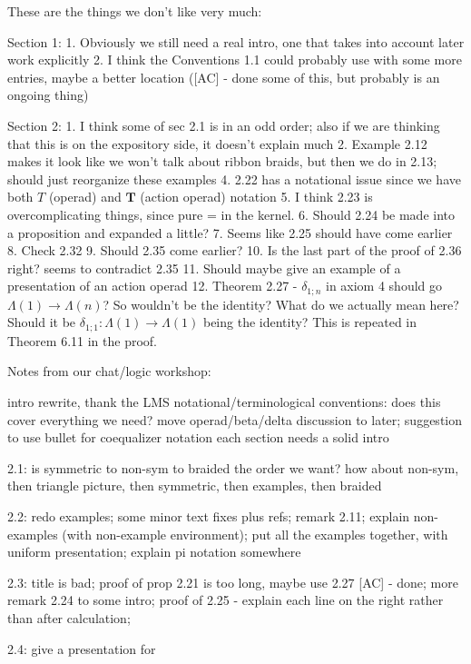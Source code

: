 These are the things we don't like very much:

Section 1:
1. Obviously we still need a real intro, one that takes into account later work explicitly
2. I think the Conventions 1.1 could probably use with some more entries, maybe a better location ([AC] - done some of this, but probably is an ongoing thing)

Section 2:
1. I think some of sec 2.1 is in an odd order; also if we are thinking that this is on the expository side, it doesn't explain much
2. Example 2.12 makes it look like we won't talk about ribbon braids, but then we do in 2.13; should just reorganize these examples
4. 2.22 has a notational issue since we have both $T$ (operad) and $\mathbf{T}$ (action operad) notation
5. I think 2.23 is overcomplicating things, since pure = in the kernel.
6. Should 2.24 be made into a proposition and expanded a little?
7. Seems like 2.25 should have come earlier
8. Check 2.32
9. Should 2.35 come earlier?
10. Is the last part of the proof of 2.36 right? seems to contradict 2.35
11. Should maybe give an example of a presentation of an action operad 
12. Theorem 2.27 - $\delta_{1;n}$ in axiom 4 should go $\Lambda(1) \rightarrow \Lambda(n)$? So wouldn't be the identity? What do we actually mean here? Should it be $\delta_{1;1} \colon \Lambda(1) \rightarrow \Lambda(1)$ being the identity? This is repeated in Theorem 6.11 in the proof.


Notes from our chat/logic workshop:

intro rewrite, thank the LMS 
notational/terminological conventions: does this cover everything we need? move operad/beta/delta discussion to later; suggestion to use bullet for coequalizer notation
each section needs a solid intro

2.1: is symmetric to non-sym to braided the order we want? how about non-sym, then triangle picture, then symmetric, then examples, then braided

2.2: redo examples; some minor text fixes plus refs; remark 2.11; explain non-examples (with non-example environment); put all the examples together, with uniform presentation; explain pi notation somewhere

2.3: title is bad;
proof of prop 2.21 is too long, maybe use 2.27 [AC] - done;
more remark 2.24 to some intro;
proof of 2.25 - explain each line on the right rather than after calculation; 

2.4: give a presentation for \Sigma [NG]


